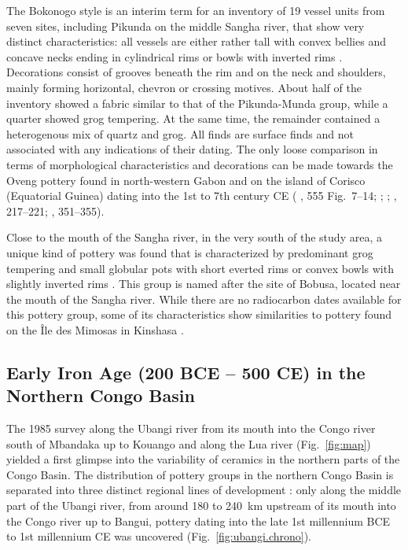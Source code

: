 \documentclass[smallextended,natbib]{svjour3}       %
\begin{document}
The Bokonogo style is an interim term for an inventory of 19 vessel units from seven sites, including Pikunda on the middle Sangha river, that show very distinct characteristics: all vessels are either rather tall with convex bellies and concave necks ending in cylindrical rims or bowls with inverted rims \citep[Fig.~\ref{fig:sangha}.4;][120--123]{Seidensticker.2021e}. Decorations consist of grooves beneath the rim and on the neck and shoulders, mainly forming horizontal, chevron or crossing motives. About half of the inventory showed a fabric similar to that of the Pikunda-Munda group, while a quarter showed grog tempering. At the same time, the remainder contained a heterogenous mix of quartz and grog. All finds are surface finds and not associated with any indications of their dating. The only loose comparison in terms of morphological characteristics and decorations can be made towards the Oveng pottery found in north-western Gabon \citep[615--618]{Clist.20042005} and on the island of Corisco (Equatorial Guinea) dating into the 1st to 7th century CE (\citeauthor{Clist.20042005} \citeyear{Clist.20042005}, 555 Fig.~7–14; \citeauthor{GonzalezRuibal.2011} \citeyear{GonzalezRuibal.2011}; \citeyear{GonzalesRuibal.2012}; \citeauthor{SanchezElipe.2015} \citeyear{SanchezElipe.2015}, 217--221; \citeauthor{SanchezElipe.2016} \citeyear{SanchezElipe.2016}, 351--355).

Close to the mouth of the Sangha river, in the very south of the study area, a unique kind of pottery was found that is characterized by predominant grog tempering and small globular pots with short everted rims or convex bowls with slightly inverted rims \citep[Fig.~\ref{fig:sangha}.6--8;][162--165]{Seidensticker.2021e}. This group is named after the site of Bobusa, located near the mouth of the Sangha river. While there are no radiocarbon dates available for this pottery group, some of its characteristics show similarities to pottery found on the Île des Mimosas in Kinshasa \citep[279--280]{Eggert.1984}.

\subsection*{Early Iron Age (200 BCE – 500 CE) in the Northern Congo Basin}

The 1985 survey along the Ubangi river from its mouth into the Congo river south of Mbandaka up to Kouango and along the Lua river (Fig.~\ref{fig:map}) yielded a first glimpse into the variability of ceramics in the northern parts of the Congo Basin. The distribution of pottery groups in the northern Congo Basin is separated into three distinct regional lines of development \citep[183--185]{Seidensticker.2021e}: only along the middle part of the Ubangi river, from around 180 to 240~km upstream of its mouth into the Congo river up to Bangui, pottery dating into the late 1st millennium BCE to 1st millennium CE was uncovered (Fig.~\ref{fig:ubangi.chrono}).
\end{document}

